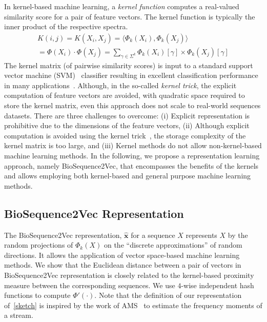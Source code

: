 \documentclass[runningheads]{llncs}
\newcommand{\vect}[1]{\mathbf{#1}}
\begin{document}
In kernel-based machine learning, a {\em kernel function} computes a real-valued similarity score for a  pair of feature vectors. The kernel function is typically the inner product of the respective spectra. 
\begin{equation}\label{defkernelValue}
\begin{aligned}
    K(i,j) = K(X_i,X_j) = \langle  \Phi_k (X_i), \Phi_k (X_j) \rangle
    \\
     = \Phi (X_i) \cdot \Phi (X_j)
          = \sum_{\gamma \in \Sigma^k} \Phi_k(X_i) [\gamma] \times \Phi_k(X_j) [\gamma]
\end{aligned}
\end{equation}
The kernel matrix (of pairwise similarity scores) is input to a
standard support vector machine
(SVM)~\cite{cristianini2000introduction}
classifier resulting in excellent classification performance in many
applications~\cite{farhan2017efficient}. Although,
in the so-called {\em kernel trick}, the explicit computation of
feature vectors are avoided, with quadratic space required to store the
kernel matrix, even this approach does not scale to real-world
sequences datasets.
There are three challenges to overcome: (i) Explicit representation is prohibitive due to the dimensions of the feature vectors, (ii) Although explicit computation is avoided using the kernel trick~\cite{farhan2017efficient}, the storage complexity of the kernel matrix is too large, and (iii) Kernel methods do not allow non-kernel-based machine learning methods.
In the following, we propose a representation learning approach,
namely BioSequence2Vec, that encompasses the benefits of the
kernels and allows employing both kernel-based and general purpose
machine learning methods.

\subsection{BioSequence2Vec Representation}

The BioSequence2Vec representation, $\vect{\hat{x}}$ for a sequence
$X$ represents $X$ by the random projections of $\Phi_k(X)$ on the
``discrete approximations'' of random directions. It allows the
application of vector space-based machine learning methods. We show
that the Euclidean distance between a pair of vectors in
BioSequence2Vec representation is closely related to the kernel-based
proximity measure between the corresponding sequences. We use $4$-wise
independent hash functions to compute $\Phi'(\cdot)$.
Note that the definition of our representation
of~\eqref{sketch} is inspired by the work of AMS~\cite{alon1996space}
to estimate the frequency moments of a stream.
\end{document}
